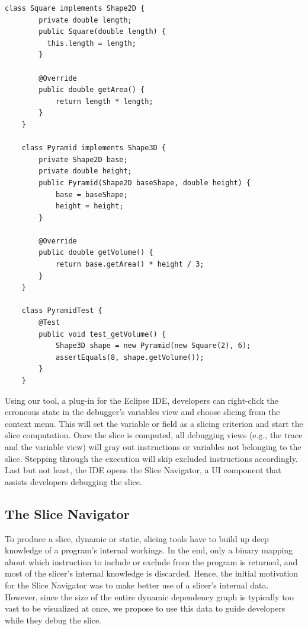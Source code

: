 \documentclass[
			english,
			]{elsarticle}
\begin{document}
\begin{lstlisting}[float,label=lst:example,caption={Example program with a failing test case}]
	class Square implements Shape2D {
		private double length;
		public Square(double length) { 
		  this.length = length;
		}
		
		@Override
		public double getArea() { 
			return length * length;
		}
	}
	
	class Pyramid implements Shape3D {
		private Shape2D base;
		private double height;
		public Pyramid(Shape2D baseShape, double height) {
			base = baseShape;
			height = height;
		}
		
		@Override
		public double getVolume() { 
			return base.getArea() * height / 3; 
		}
	}
	
	class PyramidTest {
		@Test
		public void test_getVolume() {
			Shape3D shape = new Pyramid(new Square(2), 6);
			assertEquals(8, shape.getVolume());
		}
	}
\end{lstlisting}


Using our tool, a plug-in for the Eclipse IDE, developers can right-click the erroneous state in the debugger's variables view and choose slicing from the context menu.
This will set the variable or field as a slicing criterion and start the slice computation.
Once the slice is computed, all debugging views (e.g., the trace and the variable view) will gray out instructions or variables not belonging to the slice.
Stepping through the execution will skip excluded instructions accordingly.
Last but not least, the IDE opens the Slice Navigator, a UI component that assists developers debugging the slice.



\subsection{The Slice Navigator}
\label{sec:the_slice_navigator}

To produce a slice, dynamic or static, slicing tools have to build up deep knowledge of a program's internal workings.
In the end, only a binary mapping about which instruction to include or exclude from the program is returned, and most of the slicer's internal knowledge is discarded.
Hence, the initial motivation for the Slice Navigator was to make better use of a slicer's internal data.
However, since the size of the entire dynamic dependency graph is typically too vast to be visualized at once, we propose to use this data to guide developers while they debug the slice.
\end{document}
